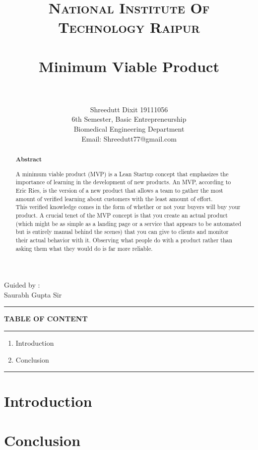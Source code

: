\documentclass[paper=a4, fontsize=11pt]{scrartcl}
\title{
		\usefont{OT1}{bch}{b}{n}
		\normalfont \normalsize \textsc{National Institute Of Technology Raipur} \\ [25pt]
		\horrule{0.5pt} \\[0.4cm]
		\huge Minimum Viable Product  \\
		\horrule{2pt} \\[0.5cm]
}
\author{
        Shreedutt Dixit 19111056\\6th Semester, 
        Basic Entrepreneurship\\ Biomedical Engineering Department\\	
        Email: Shreedutt77@gmail.com
        \normalsize
}
\date{}
\numberwithin{equation}{section}		%
\numberwithin{figure}{section}			%
\numberwithin{table}{section}				%
\begin{document}
\maketitle
\begin{flushright}
    Guided by :\\
    Saurabh Gupta Sir
\end{flushright}

\noindent\rule{\textwidth}{1pt}
\begin{abstract}

    \begin{center}
        \Large{\textbf{Abstract}}\\
        
    \end{center}

    \Large { A minimum viable product (MVP) is a Lean Startup concept that emphasizes the importance of learning in the development of new products. An MVP, according to Eric Ries, is the version of a new product that allows a team to gather the most amount of verified learning about customers with the least amount of effort.\\
    This verified knowledge comes in the form of whether or not your buyers will buy your product.
    \newpage
    A crucial tenet of the MVP concept is that you create an actual product (which might be as simple as a landing page or a service that appears to be automated but is entirely manual behind the scenes) that you can give to clients and monitor their actual behavior with it. Observing what people do with a product rather than asking them what they would do is far more reliable. }
\end{abstract}

\newpage
\textbf{TABLE OF CONTENT}\\
\rule{\textwidth}{1pt}
\begin{enumerate}
    \item Introduction
    \item Conclusion
\end{enumerate}
\rule{\textwidth}{1pt}
\newpage
\Large
\section{Introduction}

\section{Conclusion}
\end{document}
